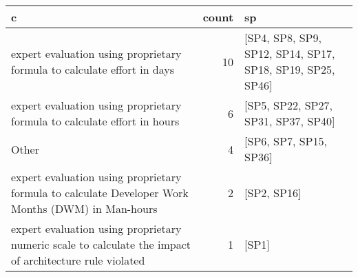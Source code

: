 \begin{tabular}{lrl}
\toprule
                                                                                                       c &  count &                                                         sp \\
\midrule
                                 expert evaluation using proprietary formula to calculate effort in days &     10 &  [SP4, SP8, SP9, SP12, SP14, SP17, SP18, SP19, SP25, SP46] \\
                                expert evaluation using proprietary formula to calculate effort in hours &      6 &                        [SP5, SP22, SP27, SP31, SP37, SP40] \\
                                                                                                   Other &      4 &                                     [SP6, SP7, SP15, SP36] \\
       expert evaluation using proprietary formula to calculate Developer Work Months (DWM) in Man-hours &      2 &                                                [SP2, SP16] \\
 expert evaluation using proprietary numeric scale to calculate the impact of architecture rule violated &      1 &                                                      [SP1] \\
\bottomrule
\end{tabular}
